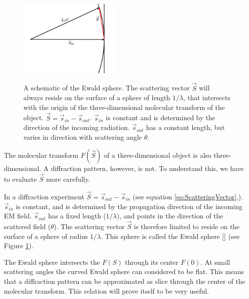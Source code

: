 \begin{figure}[h]
	\centering 
	\includegraphics[width=50mm]{ewald_sphere.png}
	\label{fig:EwaldSphere}
	\caption{A schematic of the Ewald sphere. The scattering vector $\vec{S}$ will always reside on the surface of a sphere of length $1/\lambda$, that intersects with the origin of the three-dimensional molecular transform of the object. $\vec{S} = \vec{s}_{in} - \vec{s}_{out}$. $\vec{s}_{in}$ is constant and is determined by the direction of the incoming radiation. $\vec{s}_{out}$ has a constant length, but varies in direction with scattering angle $\theta$. }
\end{figure}

The molecular transform $F(\vec{S})$ of a three-dimensional object is also three-dimensional. A diffraction pattern, however, is not. To understand this, we have to evaluate $\vec{S}$ more carefully. 

In a diffraction experiment $\vec{S} = \vec{s}_{out} -\vec{s}_{in}$ (see equation \ref{eq:ScatteringVector},). $\vec{s}_{in}$ is constant, and is determined by the propagation direction of the incoming EM field. $\vec{s}_{out}$ has a fixed length ($1/\lambda$), and points in the direction of the scattered field ($\theta$). The scattering vector $\vec{S}$ is therefore limited to reside on the surface of a sphere of radius $1/\lambda$. This sphere is called the Ewald sphere [] (see Figure \ref{fig:EwaldSphere}). 


The Ewald sphere intersects the $F(S)$ through its center $F(0)$. At small scattering angles the curved Ewald sphere can considered to be flat. This means that a diffraction pattern can be approximated as slice through the center of the molecular transform.  This relation will prove itself to be very useful.

